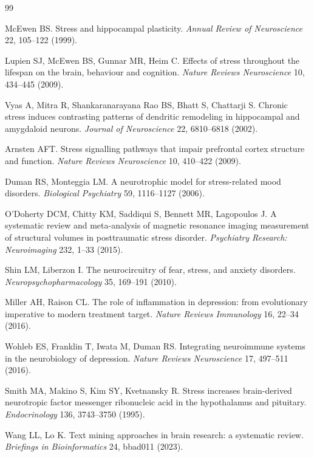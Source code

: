 \documentclass[12pt,a4paper]{article}
\begin{document}

\begin{thebibliography}{99}

McEwen BS.
\newblock Stress and hippocampal plasticity.
\newblock \textit{Annual Review of Neuroscience} 22, 105--122 (1999).

Lupien SJ, McEwen BS, Gunnar MR, Heim C.
\newblock Effects of stress throughout the lifespan on the brain, behaviour and cognition.
\newblock \textit{Nature Reviews Neuroscience} 10, 434--445 (2009).

Vyas A, Mitra R, Shankaranarayana Rao BS, Bhatt S, Chattarji S.
\newblock Chronic stress induces contrasting patterns of dendritic remodeling in hippocampal and amygdaloid neurons.
\newblock \textit{Journal of Neuroscience} 22, 6810--6818 (2002).

Arnsten AFT.
\newblock Stress signalling pathways that impair prefrontal cortex structure and function.
\newblock \textit{Nature Reviews Neuroscience} 10, 410--422 (2009).

Duman RS, Monteggia LM.
\newblock A neurotrophic model for stress-related mood disorders.
\newblock \textit{Biological Psychiatry} 59, 1116--1127 (2006).

O'Doherty DCM, Chitty KM, Saddiqui S, Bennett MR, Lagopoulos J.
\newblock A systematic review and meta-analysis of magnetic resonance imaging measurement of structural volumes in posttraumatic stress disorder.
\newblock \textit{Psychiatry Research: Neuroimaging} 232, 1--33 (2015).

Shin LM, Liberzon I.
\newblock The neurocircuitry of fear, stress, and anxiety disorders.
\newblock \textit{Neuropsychopharmacology} 35, 169--191 (2010).

Miller AH, Raison CL.
\newblock The role of inflammation in depression: from evolutionary imperative to modern treatment target.
\newblock \textit{Nature Reviews Immunology} 16, 22--34 (2016).

Wohleb ES, Franklin T, Iwata M, Duman RS.
\newblock Integrating neuroimmune systems in the neurobiology of depression.
\newblock \textit{Nature Reviews Neuroscience} 17, 497--511 (2016).

Smith MA, Makino S, Kim SY, Kvetnansky R.
\newblock Stress increases brain-derived neurotropic factor messenger ribonucleic acid in the hypothalamus and pituitary.
\newblock \textit{Endocrinology} 136, 3743--3750 (1995).

Wang LL, Lo K.
\newblock Text mining approaches in brain research: a systematic review.
\newblock \textit{Briefings in Bioinformatics} 24, bbad011 (2023).

\end{thebibliography}
\end{document}
